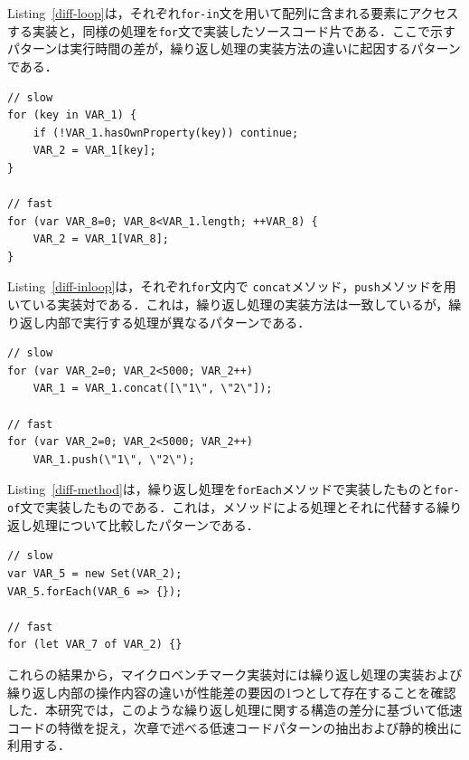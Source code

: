 \documentclass[submit,techrep,noauthor]{ipsj}
\begin{document}
Listing~\ref{diff-loop}は，それぞれ\texttt{for-in}文を用いて配列に含まれる要素にアクセスする実装と，同様の処理を\texttt{for}文で実装したソースコード片である．ここで示すパターンは実行時間の差が，繰り返し処理の実装方法の違いに起因するパターンである．
\begin{lstlisting}[caption=Pairs with loop differences, label=diff-loop, captionpos=t, columns=flexible]
// slow
for (key in VAR_1) {
    if (!VAR_1.hasOwnProperty(key)) continue;
    VAR_2 = VAR_1[key];
}

// fast
for (var VAR_8=0; VAR_8<VAR_1.length; ++VAR_8) {
    VAR_2 = VAR_1[VAR_8];
}
\end{lstlisting}

Listing~\ref{diff-inloop}は，それぞれ\texttt{for}文内で \texttt{concat}メソッド，\texttt{push}メソッドを用いている実装対である．これは，繰り返し処理の実装方法は一致しているが，繰り返し内部で実行する処理が異なるパターンである．
\begin{lstlisting}[caption=Pairs with differences within the loop, label=diff-inloop, captionpos=t, columns=flexible]
// slow
for (var VAR_2=0; VAR_2<5000; VAR_2++)
    VAR_1 = VAR_1.concat([\"1\", \"2\"]);

// fast
for (var VAR_2=0; VAR_2<5000; VAR_2++)
    VAR_1.push(\"1\", \"2\");
\end{lstlisting}

Listing~\ref{diff-method}は，繰り返し処理を\texttt{forEach}メソッドで実装したものと\texttt{for-of}文で実装したものである．これは，メソッドによる処理とそれに代替する繰り返し処理について比較したパターンである．
\begin{lstlisting}[caption=Pairs of Method and alternative loop, label=diff-method, captionpos=t, columns=flexible]
// slow
var VAR_5 = new Set(VAR_2);
VAR_5.forEach(VAR_6 => {});

// fast
for (let VAR_7 of VAR_2) {}
\end{lstlisting}

これらの結果から，マイクロベンチマーク実装対には繰り返し処理の実装および繰り返し内部の操作内容の違いが性能差の要因の1つとして存在することを確認した．本研究では，このような繰り返し処理に関する構造の差分に基づいて低速コードの特徴を捉え，次章で述べる低速コードパターンの抽出および静的検出に利用する．


\end{document}
